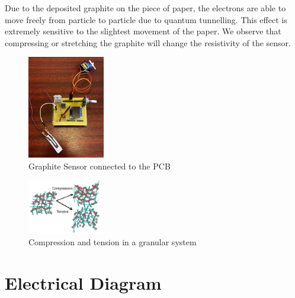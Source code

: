 \documentclass[10pt]{datasheet}
\begin{document}
Due to the deposited graphite on the piece of paper, the electrons are able to move freely from particle to particle due to quantum tunnelling. This effect is
extremely sensitive to the slightest movement of the paper. We observe that compressing or stretching the graphite will change the resistivity of the 
sensor. 


\vfill\break

\hspace{1pt}

\vspace{0.65cm}

\begin{figure}[h!]
	\centering
	\includegraphics[width=0.3\textwidth]{Cover/PCB-Sensor.jpg}
	\caption{\small{Graphite Sensor connected to the PCB}}
\end{figure}

\vspace{1.5cm}

\begin{figure}[h!]
	\centering
	\includegraphics[width=0.3\textwidth]{Cover/Electron-Movement.png}
	\caption{\small{Compression and tension in a granular system}}
\end{figure}

\onecolumn

\section{Electrical Diagram}
\end{document}
